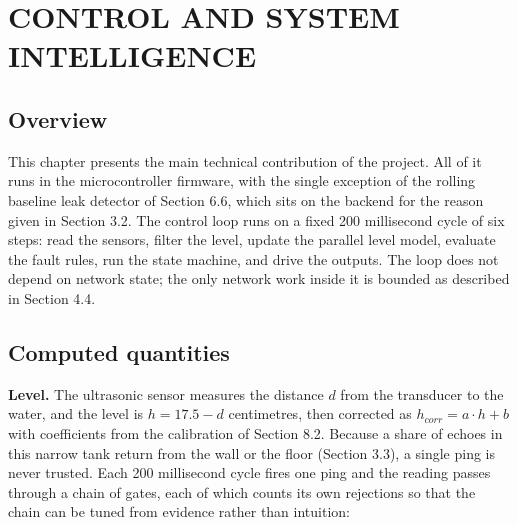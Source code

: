 \chapter{CONTROL AND SYSTEM INTELLIGENCE}

\section{Overview}

This chapter presents the main technical contribution of the project. All of it runs in the microcontroller firmware, with the single exception of the rolling baseline leak detector of Section 6.6, which sits on the backend for the reason given in Section 3.2. The control loop runs on a fixed 200 millisecond cycle of six steps: read the sensors, filter the level, update the parallel level model, evaluate the fault rules, run the state machine, and drive the outputs. The loop does not depend on network state; the only network work inside it is bounded as described in Section 4.4.

\section{Computed quantities}

\textbf{Level.} The ultrasonic sensor measures the distance $d$ from the transducer to the water, and the level is $h = 17.5 - d$ centimetres, then corrected as $h_{corr} = a \cdot h + b$ with coefficients from the calibration of Section 8.2. Because a share of echoes in this narrow tank return from the wall or the floor (Section 3.3), a single ping is never trusted. Each 200 millisecond cycle fires one ping and the reading passes through a chain of gates, each of which counts its own rejections so that the chain can be tuned from evidence rather than intuition:

